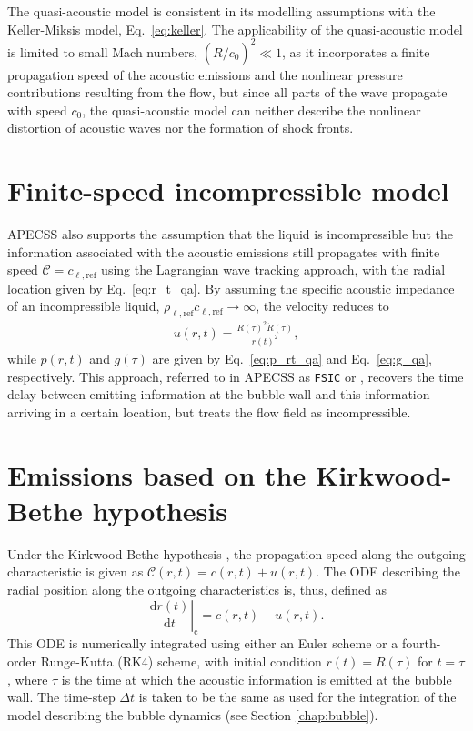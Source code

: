 The quasi-acoustic model is consistent in its modelling assumptions with the Keller-Miksis model, Eq.~\eqref{eq:keller}. The applicability of the quasi-acoustic model is limited to small Mach numbers, $(\dot{R}/c_0)^2 \ll 1$, as it incorporates a finite propagation speed of the acoustic emissions and the nonlinear pressure contributions resulting from the flow, but since all parts of the wave propagate with speed $c_0$, the quasi-acoustic model can neither describe the nonlinear distortion of acoustic waves nor the formation of shock fronts. 

\section{Finite-speed incompressible model}
\label{sec:emissionsfsic}

APECSS also supports the assumption that the liquid is incompressible but the information associated with the acoustic emissions still propagates with finite speed $\mathcal{C} = c_{\ell,\mathrm{ref}}$ using the Lagrangian wave tracking approach, with the radial location given by Eq.~\eqref{eq:r_t_qa}.
By assuming the specific acoustic impedance of an incompressible liquid, $\rho_{\ell,\mathrm{ref}} c_{\ell,\mathrm{ref}} \rightarrow \infty$, the velocity reduces to
\begin{align}
    u(r,t) = \frac{R(\tau)^2 \dot{R}(\tau)}{r(t)^2}, \label{eq:u_rt_fsic} 
\end{align}
while $p(r,t)$ and $g(\tau)$ are given by Eq.~\eqref{eq:p_rt_qa} and Eq.~\eqref{eq:g_qa}, respectively.
This approach, referred to in APECSS as {\tt FSIC} or , recovers the time delay between emitting information at the bubble wall and this information arriving in a certain location, but treats the flow field as incompressible.

\section{Emissions based on the Kirkwood-Bethe hypothesis}
\label{sec:emissionskb}

Under the Kirkwood-Bethe hypothesis \citep{Kirkwood1942,Cole1948}, the propagation speed along the outgoing characteristic is given as $\mathcal{C}(r,t) = c(r,t) + u(r,t)$. The ODE describing the radial position along the outgoing characteristics is, thus, defined as 
\begin{equation}
    \left. \frac{\mathrm{d}r(t)}{\mathrm{d}t} \right|_\text{c} = c(r,t) + u(r,t). \label{eq:drdt}
\end{equation}
This ODE is numerically integrated using either an Euler scheme or a fourth-order Runge-Kutta (RK4) scheme, with initial condition $r(t) = R(\tau)$ for $t=\tau$, where $\tau$ is the time at which the acoustic information is emitted at the bubble wall. The time-step $\Delta t$ is taken to be the same as used for the integration of the model describing the bubble dynamics (see Section \ref{chap:bubble}).


